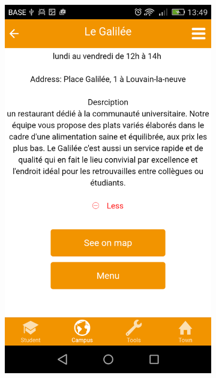 \documentclass{eplmastersthesis}
\begin{document}
\begin{figure}
    \centering
\begin{subfigure}[b]{0.3\textwidth}
        \includegraphics[width=\textwidth]{Images/Application_screens/Screenshot_2016-06-06-13-49-30.png}
    \end{subfigure}
    ~ %
    \begin{subfigure}[b]{0.3\textwidth}

\end{subfigure}
\end{figure}
\end{document}
